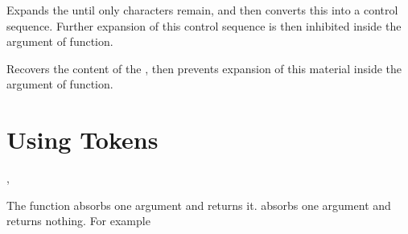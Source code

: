 \documentclass[oneside]{book}
\let\tn=\cs
\begin{document}
\begin{function}{\onlyName}
\begin{syntax}
 
\end{syntax}
Expands the  until only characters remain, and then
converts this into a control sequence.
Further expansion of this control sequence is then inhibited
inside the argument of  function.
\end{function}

\begin{function}{\onlyValue}
\begin{syntax}
 
\end{syntax}
Recovers the content of the , then prevents expansion
of this material inside the argument of  function.
\end{function}

\section{Using Tokens}

\begin{function}{\useOne,\gobbleOne}
\begin{syntax}
 
 
\end{syntax}
The function  absorbs one argument and returns it.
 absorbs one argument and returns nothing.
For example
\begin{demohigh}
\end{demohigh}
\end{function}
\end{document}
